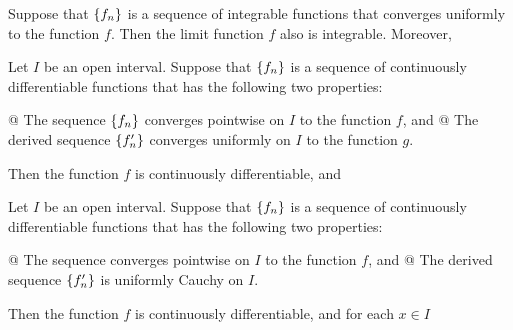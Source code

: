     \begin{thm}
        Suppose that ${\left\{ f_n \right\}}$ is a sequence of integrable functions that converges uniformly to the function $f$.
        Then the limit function $f$ also is integrable. Moreover,
    \end{thm}

    \begin{thm}
        Let $I$ be an open interval. Suppose that ${\left\{ f_n \right\}}$ is a sequence of continuously differentiable functions
        that has the following two properties:
        \begin{easylist}[enumerate]
            @ The sequence ${\left\{ f_n \right\}}$ converges pointwise on $I$ to the function $f$, and
            @ The derived sequence ${\left\{ f^\prime_n \right\}}$ converges uniformly on $I$ to the function $g$.
        \end{easylist}
        Then the function $f$ is continuously differentiable, and
    \end{thm}

    \begin{thm}
        Let $I$ be an open interval. Suppose that ${\left\{ f_n \right\}}$ is a sequence of continuously differentiable functions
        that has the following two properties:
        \begin{easylist}[enumerate]
            @ The sequence converges pointwise on $I$ to the function $f$, and
            @ The derived sequence ${\left\{ f^\prime_n \right\}}$ is uniformly Cauchy on $I$.
        \end{easylist}
        Then the function $f$ is continuously differentiable, and for each $x \in I$
    \end{thm}
